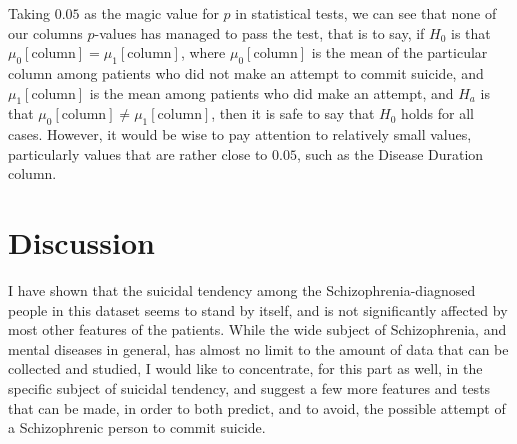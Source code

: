 \documentclass{article}
\begin{document}
Taking $0.05$ as the magic value for $p$ in statistical tests, we can see that none of our columns $p$-values has managed to pass the test, that is to say, if $H_0$ is that $\mu_0[\text{column}]=\mu_1[\text{column}]$, where $\mu_0[\text{column}]$ is the mean of the particular column among patients who did not make an attempt to commit suicide, and $\mu_1[\text{column}]$ is the mean among patients who did make an attempt, and $H_a$ is that $\mu_0[\text{column}]\neq\mu_1[\text{column}]$, then it is safe to say that $H_0$ holds for all cases. However, it would be wise to pay attention to relatively small values, particularly values that are rather close to $0.05$, such as the Disease Duration column.

\section{Discussion}
I have shown that the suicidal tendency among the Schizophrenia-diagnosed people in this dataset seems to stand by itself, and is not significantly affected by most other features of the patients. While the wide subject of Schizophrenia, and mental diseases in general, has almost no limit to the amount of data that can be collected and studied, I would like to concentrate, for this part as well, in the specific subject of suicidal tendency, and suggest a few more features and tests that can be made, in order to both predict, and to avoid, the possible attempt of a Schizophrenic person to commit suicide.
\end{document}
